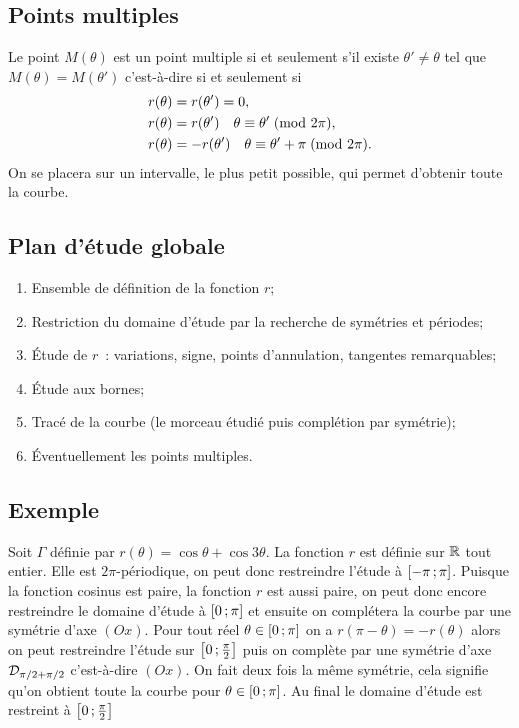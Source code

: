 \subsection{Points multiples}
Le point \(M(\theta)\) est un point multiple si et seulement s'il existe \(\theta' \neq \theta\) tel que \(M(\theta)=M(\theta')\) c'est-à-dire si et seulement si
\begin{align}
 r(\theta)&=r(\theta')=0, \\
 r(\theta)&=r(\theta') \quad \theta \equiv \theta'\!\pmod {2\pi},\\
 r(\theta)&=-r(\theta') \quad \theta \equiv \theta'+\pi\!\pmod {2\pi}.
\end{align}
On se placera sur un intervalle, le plus petit possible, qui permet d'obtenir toute la courbe.
\subsection{Plan d'étude globale}
\begin{enumerate}
\item Ensemble de définition de la fonction \(r\);
\item Restriction du domaine d'étude par la recherche de symétries et périodes;
\item Étude de \(r\)~: variations, signe, points d'annulation, tangentes remarquables;
\item Étude aux bornes;
\item Tracé de la courbe (le morceau étudié puis complétion par symétrie);
\item Éventuellement les points multiples.
\end{enumerate}

\subsection{Exemple}

Soit \(\Gamma\) définie par \(r(\theta)=\cos \theta + \cos 3\theta\). La fonction \(r\) est définie sur \(\mathbb{R}\) tout entier. Elle est \(2\pi\)-périodique, on peut donc restreindre l'étude à \(\left[ -\pi \, ;  \pi \right]\). Puisque la fonction cosinus est paire, la fonction \(r\) est aussi paire, on peut donc encore restreindre le domaine d'étude à \(\left[ 0 \, ;  \pi \right]\) et ensuite on complétera la courbe par une symétrie d'axe \((Ox)\). Pour tout réel \(\theta \in \left[ 0 \, ;  \pi \right]\) on a \(r(\pi-\theta)=-r(\theta)\) alors on peut restreindre l'étude sur \(\left[ 0 \, ;  \frac{\pi}{2} \right]\) puis on complète par une symétrie d'axe \(\mathcal{D}_{\pi/2+\pi/2}\) c'est-à-dire \((Ox)\). On fait deux fois la même symétrie, cela signifie qu'on obtient toute la courbe pour \(\theta \in \left[ 0 \, ;  \pi \right]\). Au final le domaine d'étude est restreint à \(\left[ 0 \, ;  \frac{\pi}{2} \right]\)

